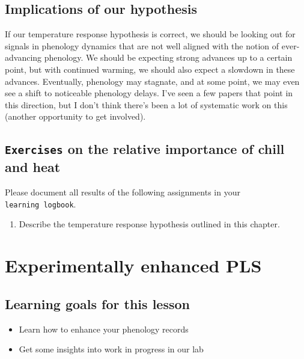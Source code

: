 \documentclass[
]{book}
\providecommand{\tightlist}{%
  \setlength{\itemsep}{0pt}\setlength{\parskip}{0pt}}
\begin{document}
\hypertarget{implications-of-our-hypothesis}{%
\section{Implications of our hypothesis}\label{implications-of-our-hypothesis}}

If our temperature response hypothesis is correct, we should be looking out for signals in phenology dynamics that are not well aligned with the notion of ever-advancing phenology. We should be expecting strong advances up to a certain point, but with continued warming, we should also expect a slowdown in these advances. Eventually, phenology may stagnate, and at some point, we may even see a shift to noticeable phenology delays. I've seen a few papers that point in this direction, but I don't think there's been a lot of systematic work on this (another opportunity to get involved).

\hypertarget{exercises_PLS_chillforce_relimp}{%
\section*{\texorpdfstring{\texttt{Exercises} on the relative importance of chill and heat}{Exercises on the relative importance of chill and heat}}\label{exercises_PLS_chillforce_relimp}}

Please document all results of the following assignments in your \texttt{learning\ logbook}.

\begin{enumerate}
\def\labelenumi{\arabic{enumi})}
\tightlist
\item
  Describe the temperature response hypothesis outlined in this chapter.
\end{enumerate}

\hypertarget{exp_PLS}{%
\chapter{Experimentally enhanced PLS}\label{exp_PLS}}

\hypertarget{goals_exp_PLS}{%
\section*{Learning goals for this lesson}\label{goals_exp_PLS}}

\begin{itemize}
\tightlist
\item
  Learn how to enhance your phenology records
\item
  Get some insights into work in progress in our lab
\end{itemize}
\end{document}

